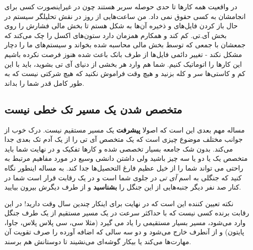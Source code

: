 در واقعیت همه کارها تا حدی حوصله سربر هستند چون در غیراینصورت کسی برای انجامشان به کسی حقوق نمی داد. من ساعت‌هایی از روز در نقش تحلیلگر سیستم در حال باز کردن فایل‌های  و ذخیره آن‌ها به شکل  هستم تا بخش مالی فشارش را روی بخش آی.تی. کم کند و همکارم همزمان دارد ستون‌های اکسل را چک می‌کند که جمعشان با جمعی که توسط بخش مالی محاسبه شده بخواند و سیستم‌های ما را دچار مشکل نکند - تغییر دائمی فایل‌ها از طرف بانک باعث شده هنوز فرصت نکرده باشیم این کارها را اتوماتیک کنیم. شما هم وارد هر بخشی از دنیای آی تی بشوید، باید با این کم و کاستی‌ها سر و کله بزنید و هیچ وقت فراموش نکنید که هیچ شرکتی نیست که به طور کامل قدر شما را بداند.
\subsection*{متخصص شدن یک مسیر تک خطی نیست}
مساله مهم بعدی این است که اصولا
\textbf{پیشرفت}
یک مسیر مستقیم نیست. درک خوب از جوانب مختلف موضوع چیزی است که یک متخصص آی تی را از یک آدم تک بعدی جدا می‌کند. بدون شک جامعه بسیار تخصصی شده و کارها تفکیک و در نهایت شما باید متخصص یک یا دو یا سه چیز باشید ولی داشتن دانشی وسیع در مورد مفاهیم مرتبط به راحتی می تواند شما را از خیل عظیم فارغ التحصیل‌ها جدا کند. به مساله اینطور نگاه کنید که جنگلی به اسم
\emph{آی تی}
در جلوی شما است و در یک رقابت قرار است شما در کنار صد نفر دیگر جنبه‌هایی از این جنگل را
\textbf{بشناسید}
و از طرف دیگرش بیرون بیایید.

نکته تعیین کننده این است که در نهایت برای اینکار چندین سال وقت دارید! در این رقابت برنده کسی نیست که با حداکثر سرعت در یک مسیر مستقیم از یک طرف جنگل وارد می‌شود، مسیر بسیار مستقیمی را یاد می گیرد (مثلا سی، سی پلاس پلاس، جاوا، پایتون) و از آنطرف خارج می‌شود و دو سه سالی که اضافه آورده را صرف تقویت آن مهارت‌ها می‌کند یا بیکار گوشه‌ای می‌نشیند تا دوستانش هم برسند. 

